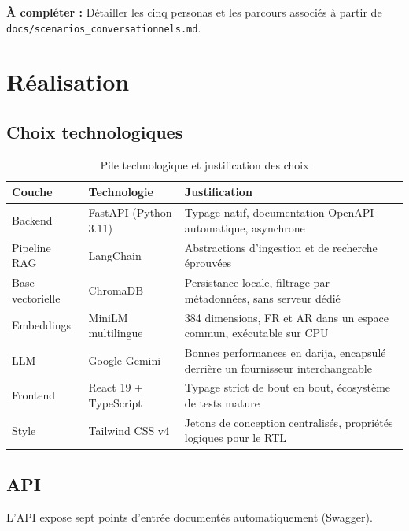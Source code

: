 \documentclass[a4paper,11pt,twoside]{report}
\newcommand{\todo}[1]{%
  \begin{tcolorbox}[colback=yellow!12,colframe=orange!70!black,left=4pt,right=4pt,top=3pt,bottom=3pt]
  \small\textbf{À compléter :} #1
  \end{tcolorbox}}
\begin{document}
\todo{Détailler les cinq personas et les parcours associés à partir de
\texttt{docs/scenarios\_conversationnels.md}.}

\chapter{Réalisation}
\label{chap:realisation}

\section{Choix technologiques}

\begin{table}[htbp]
\centering
\small
\begin{tabular}{@{}llp{6.6cm}@{}}
\toprule
\textbf{Couche} & \textbf{Technologie} & \textbf{Justification} \\
\midrule
Backend       & FastAPI (Python 3.11) & Typage natif, documentation OpenAPI automatique, asynchrone \\
Pipeline RAG  & LangChain             & Abstractions d'ingestion et de recherche éprouvées \\
Base vectorielle & ChromaDB           & Persistance locale, filtrage par métadonnées, sans serveur dédié \\
Embeddings    & MiniLM multilingue    & 384 dimensions, FR et AR dans un espace commun, exécutable sur CPU \\
LLM           & Google Gemini         & Bonnes performances en darija, encapsulé derrière un fournisseur interchangeable \\
Frontend      & React 19 + TypeScript & Typage strict de bout en bout, écosystème de tests mature \\
Style         & Tailwind CSS v4       & Jetons de conception centralisés, propriétés logiques pour le RTL \\
\bottomrule
\end{tabular}
\caption{Pile technologique et justification des choix}
\label{tab:stack}
\end{table}

\section{API}

L'API expose sept points d'entrée documentés automatiquement (Swagger).
\end{document}
